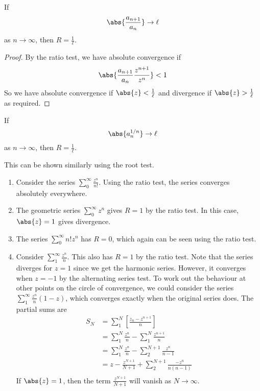 \begin{lemma}
	If
	\[
		\abs{\frac{a_{n+1}}{a_n}} \to \ell
	\]
	as \(n \to \infty\), then \(R = \frac{1}{\ell}\).
\end{lemma}
\begin{proof}
	By the ratio test, we have absolute convergence if
	\[
		\abs{\frac{a_{n+1}}{a_n} \frac{z^{n+1}}{z^n}} < 1
	\]
	So we have absolute convergence if \(\abs{z} < \frac{1}{\ell}\) and divergence if \(\abs{z} > \frac{1}{\ell}\) as required.
\end{proof}
\begin{lemma}
	If
	\[
		\abs{a_n^{1/n}} \to \ell
	\]
	as \(n \to \infty\), then \(R = \frac{1}{\ell}\).
\end{lemma}
This can be shown similarly using the root test.

\begin{example}
\begin{enumerate}
	\item Consider the series \(\sum_0^\infty \frac{z^n}{n!}\).
	      Using the ratio test, the series converges absolutely everywhere.
	\item The geometric series \(\sum_0^\infty z^n\) gives \(R=1\) by the ratio test.
	      In this case, \(\abs{z} = 1\) gives divergence.
	\item The series \(\sum_0^\infty n!z^n\) has \(R=0\), which again can be seen using the ratio test.
	\item Consider \(\sum_1^\infty \frac{z^n}{n}\).
	      This also has \(R = 1\) by the ratio test.
	      Note that the series diverges for \(z=1\) since we get the harmonic series.
	      However, it converges when \(z = -1\) by the alternating series test.
	      To work out the behaviour at other points on the circle of convergence, we could consider the series \(\sum_1^\infty \frac{z^n}{n}(1-z)\), which converges exactly when the original series does.
	      The partial sums are
	      \begin{align*}
		      S_N & = \sum_1^N \left[ \frac{z_n - z^{n+1}}{n} \right]            \\
		          & = \sum_1^N \frac{z^n}{n} - \sum_1^N \frac{z^{n+1}}{n}        \\
		          & = \sum_1^N \frac{z^n}{n} - \sum_2^{N+1} \frac{z^n}{n-1}      \\
		          & = z - \frac{z^{N+1}}{N+1} + \sum_2^{N+1} \frac{-z^n}{n(n-1)} \\
	      \end{align*}
	      If \(\abs{z} = 1\), then the term \(\frac{z^{N+1}}{N+1}\) will vanish as \(N \to \infty\).

\end{enumerate}
\end{example}
